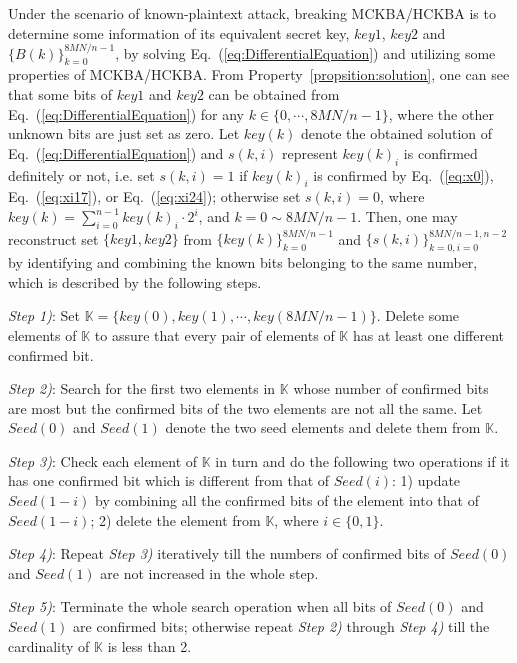 \documentclass{ws-ijbc}
\begin{document}
Under the scenario of known-plaintext attack, breaking MCKBA/HCKBA is to determine some information of its equivalent secret key, $key1$, $key2$ and $\{B(k)\}_{k=0}^{8MN/n-1}$,
by solving Eq.~(\ref{eq:DifferentialEquation}) and utilizing some properties of MCKBA/HCKBA. From Property~\ref{propsition:solution}, one can see that some bits of $key1$ and $key2$ can be obtained from Eq.~(\ref{eq:DifferentialEquation}) for any $k\in\{0, \cdots, 8MN/n-1\}$, where the other unknown bits are just set as zero. Let $key(k)$ denote the obtained solution of Eq.~(\ref{eq:DifferentialEquation}) and $s(k,i)$ represent $key(k)_i$ is confirmed definitely or not, i.e. set $s(k,i)=1$ if $key(k)_i$ is confirmed by Eq.~(\ref{eq:x0}), Eq.~(\ref{eq:xi17}), or Eq.~(\ref{eq:xi24}); otherwise set $s(k,i)=0$, where
$key(k)=\sum_{i=0}^{n-1}key(k)_i\cdot 2^i$, and $k=0\sim 8MN/n-1$. Then, one may reconstruct set $\{key1, key2\}$ from $\{key(k)\}_{k=0}^{8MN/n-1}$ and
$\{s(k,i)\}_{k=0, i=0}^{8MN/n-1, n-2}$ by identifying and combining the known bits belonging to the same number, which is described by the following steps.
\begin{itemlist}
\item \textit{Step 1)}: Set $\mathbb{K}=\{key(0), key(1), \cdots, key(8MN/n-1)\}$.
Delete some elements of $\mathbb{K}$ to assure that every pair of elements of $\mathbb{K}$ has at least one different confirmed bit.

\item \textit{Step 2)}: Search for the first two elements in $\mathbb{K}$ whose
number of confirmed bits are most but the confirmed bits of the two elements are not all the same. Let $Seed(0)$ and $Seed(1)$
denote the two seed elements and delete them from $\mathbb{K}$.

\item \textit{Step 3)}: Check each element of $\mathbb{K}$ in turn and do the following two operations if it has one confirmed bit which is different from that of $Seed(i)$:
1) update $Seed(1-i)$ by combining all the confirmed bits of the element into that of $Seed(1-i)$; 2) delete the element from $\mathbb{K}$, where
$i\in\{0, 1\}$.

\item \textit{Step 4)}: Repeat \textit{Step 3)} iteratively till the numbers of confirmed bits of $Seed(0)$ and $Seed(1)$ are not increased in the whole step.

\item \textit{Step 5)}: Terminate the whole search operation when all bits of $Seed(0)$ and $Seed(1)$ are confirmed bits; otherwise
repeat \textit{Step 2)} through \textit{Step 4)} till the cardinality of $\mathbb{K}$ is less than 2.
\end{itemlist}
\end{document}
